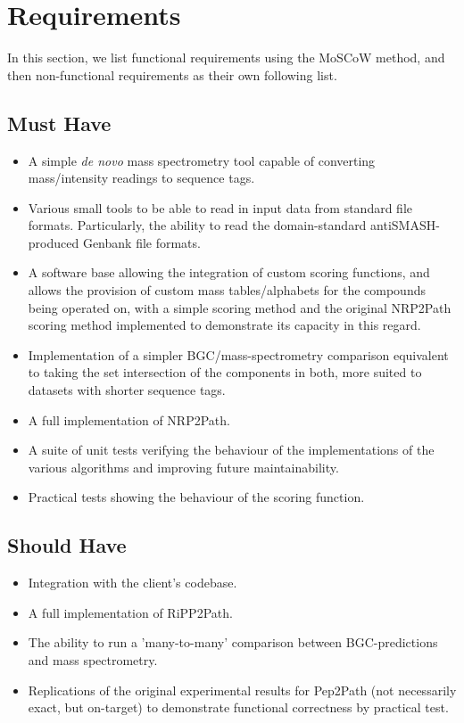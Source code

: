 \documentclass{l4proj}
\begin{document}
\section{Requirements}

In this section, we list functional requirements using the MoSCoW method, and then non-functional requirements as their own following list.

\subsection{Must Have}

\begin{itemize}

\item A simple \textit{de novo} mass spectrometry tool capable of converting mass/intensity readings to sequence tags.
\item Various small tools to be able to read in input data from standard file formats. Particularly, the ability to read the domain-standard antiSMASH-produced Genbank file formats.
\item A software base allowing the integration of custom scoring functions, and allows the provision of custom mass tables/alphabets for the compounds being operated on, with a simple scoring method and the original NRP2Path scoring method implemented to demonstrate its capacity in this regard.
\item Implementation of a simpler BGC/mass-spectrometry comparison equivalent to taking the set intersection of the components in both, more suited to datasets with shorter sequence tags.
\item A full implementation of NRP2Path.
\item A suite of unit tests verifying the behaviour of the implementations of the various algorithms and improving future maintainability.
\item Practical tests showing the behaviour of the scoring function.
\end{itemize}

\subsection{Should Have}

\begin{itemize}
\item Integration with the client's codebase.
\item A full implementation of RiPP2Path.
\item The ability to run a 'many-to-many' comparison between BGC-predictions and mass spectrometry.
\item Replications of the original experimental results for Pep2Path (not necessarily exact, but on-target) to demonstrate functional correctness by practical test.
\end{itemize}
\end{document}

